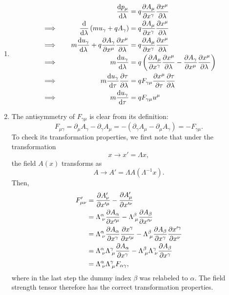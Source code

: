 \documentclass[12pt]{article}
\begin{document}
\begin{enumerate}[label=(\alph*)]
    \item 
    \begin{alignat*}{3}
        &         \quad & \dv{p_\mu}{\lambda} &= q\pdv{A_\mu}{x^\gamma}\pdv{x^\mu}{\lambda} \\
        &\implies \quad & \dv{\lambda}\left(mu_\gamma + qA_\gamma\right) &= q\pdv{A_\mu}{x^\gamma}\pdv{x^\mu}{\lambda}   \\
        &\implies \quad & m\dv{u_\gamma}{\lambda} + q\pdv{A_\gamma}{x^\mu}\pdv{x^\mu}{\lambda} & = q\pdv{A_\mu}{x^\gamma}\pdv{x^\mu}{\lambda} \\
        &\implies \quad & m\dv{u_\gamma}{\lambda} &= q\left(\pdv{A_\mu}{x^\gamma}\pdv{x^\mu}{\lambda} - \pdv{A_\gamma}{x^\mu}\pdv{x^\mu}{\lambda}\right) \\
        &\implies \quad & m\dv{u_\gamma}{\tau}\pdv{\tau}{\lambda} &= qF_{\gamma\mu}\pdv{x^\mu}{\tau}\pdv{\tau}{\lambda}  \\
        &\implies \quad & m\dv{u_\gamma}{\tau} &= qF_{\gamma\mu}u^\mu \\
    \end{alignat*}

    \item The antisymmetry of $F_{\gamma\mu}$ is clear from its definition:
    \[ F_{\mu\gamma} = \partial_\mu A_\gamma - \partial_\gamma A_\mu = -(\partial_\gamma A_\mu - \partial_\mu A_\gamma) = -F_{\gamma\mu}. \]
    To check its transformation properties, we first note that under the transformation
    \[ x \to x' = \Lambda x, \]
    the field $A(x)$ transforms as
    \[ A \to A' = \Lambda A(\Lambda^{-1}x). \]
    Then,
    \begin{align*}
        F_{\mu\nu}' &= \pdv{A_\nu'}{x'^\mu} - \pdv{A_\mu'}{x'^\nu} \\
        &= \Lambda_{\;\nu}^\alpha\pdv{A_\alpha}{x'^\mu} - \Lambda_{\;\mu}^{\beta}\pdv{A_\beta}{x'^\nu} \\
        &= \Lambda_{\;\nu}^\alpha\pdv{A_\alpha}{x^\gamma}\pdv{x^\gamma}{x'^\mu} - \Lambda_{\;\mu}^\beta\pdv{A_\beta}{x^\gamma}\pdv{x'^\gamma}{x^\nu} \\
        &= \Lambda_{\;\nu}^\alpha\Lambda_{\;\mu}^\gamma\pdv{A_\alpha}{x^\gamma} - \Lambda_{\;\mu}^\beta\Lambda_{\;\nu}^\gamma\pdv{A_\beta}{x^\gamma} \\
        &= \Lambda_{\;\nu}^\alpha\Lambda_{\;\mu}^\gamma F_{\alpha\gamma},
    \end{align*}
    where in the last step the dummy index $\beta$ was relabeled to $\alpha$. The field strength tensor therefore has the correct transformation properties.


\end{enumerate}
\end{document}
